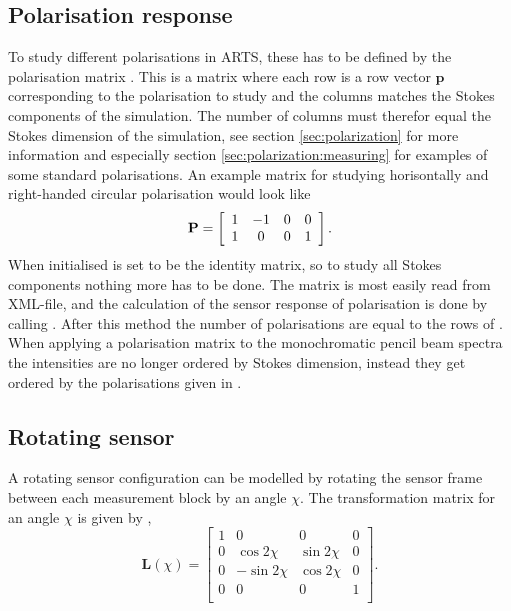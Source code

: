\subsection{Polarisation response}
\label{sec:sensor:pol:polarisation}
To study different polarisations in ARTS, these has to be defined by the polarisation matrix . This is a matrix where each row is a row vector $\mathbf{p}$ corresponding to the polarisation to study and the columns matches the Stokes components of the simulation. The number of columns must therefor equal the Stokes dimension of the simulation, see section \ref{sec:polarization} for more information and especially section \ref{sec:polarization:measuring} for examples of some standard polarisations. An example matrix for studying horisontally and right-handed circular polarisation would look like
\begin{displaymath}
  \mathbf{P} = \left[ \begin{array}{c c c c}
  1 & -1 & 0 & 0 \\ 1 & 0 & 0 & 1 \\ 
  \end{array} \right].
\end{displaymath}
When initialised  is set to be the identity matrix, so to study all Stokes
components nothing more has to be done. 
The  matrix is most easily read from XML-file, and the calculation of the sensor response of polarisation is done by calling . After this method the number of polarisations are equal to the rows of . When applying a polarisation matrix to the monochromatic pencil beam spectra the intensities are no longer ordered by Stokes dimension, instead they get ordered by the polarisations given in .


\subsection{Rotating sensor}
\label{sec:sensor:pol:rotation}
A rotating sensor configuration can be modelled by rotating the sensor frame between each measurement block by an angle $\chi$. The transformation matrix for an angle $\chi$ is given by \cite{liou:02},
\begin{equation}
  \label{eq:sensor:polrot}
  \mathbf{L}(\chi) = \left[ \begin{array}{cccc}
    1 & 0           & 0          & 0 \\
    0 & \cos 2\chi  & \sin 2\chi & 0 \\
    0 & -\sin 2\chi & \cos 2\chi & 0 \\
    0 & 0           & 0          & 1 \\
  \end{array} \right].
\end{equation}

